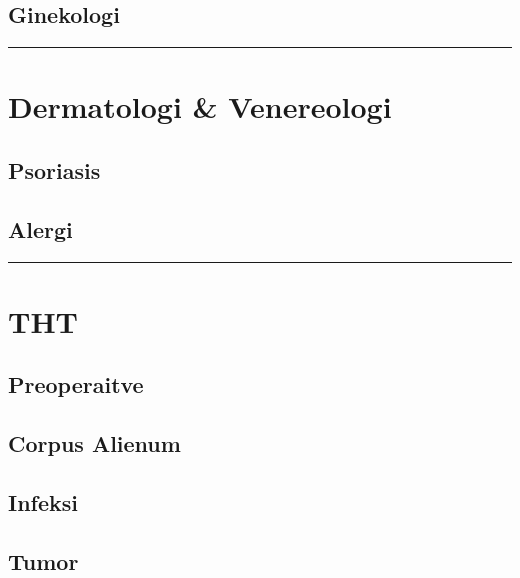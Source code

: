 \documentclass[
]{book}
\begin{document}
\hypertarget{ginekologi}{%
\subsection{Ginekologi}\label{ginekologi}}

\begin{center}\rule{0.5\linewidth}{0.5pt}\end{center}

\hypertarget{dermatologi-venereologi}{%
\section{Dermatologi \& Venereologi}\label{dermatologi-venereologi}}

\hypertarget{psoriasis}{%
\subsection{Psoriasis}\label{psoriasis}}

\hypertarget{alergi}{%
\subsection{Alergi}\label{alergi}}

\begin{center}\rule{0.5\linewidth}{0.5pt}\end{center}

\hypertarget{tht}{%
\section{THT}\label{tht}}

\hypertarget{preoperaitve}{%
\subsection{Preoperaitve}\label{preoperaitve}}

\hypertarget{corpus-alienum}{%
\subsection{Corpus Alienum}\label{corpus-alienum}}

\hypertarget{infeksi-4}{%
\subsection{Infeksi}\label{infeksi-4}}

\hypertarget{tumor}{%
\subsection{Tumor}\label{tumor}}
\end{document}
